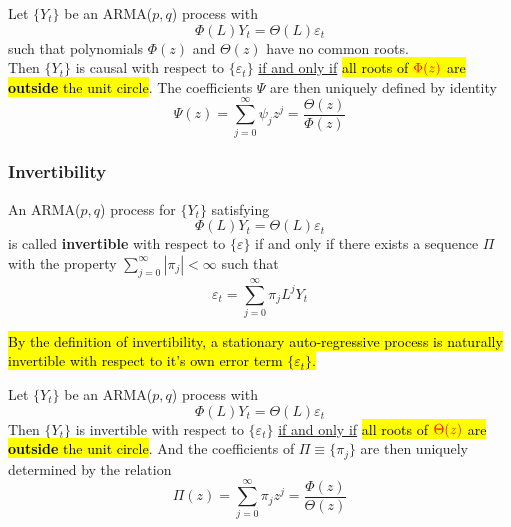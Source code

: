 \documentclass[11pt]{article}
\begin{document}
		\begin{theorem}
			Let $\{Y_t\}$ be an ARMA($p, q$) process with 
			\begin{equation}
				\Phi(L)Y_t = \Theta(L)\varepsilon_t
			\end{equation}
			such that polynomials $\Phi(z)$ and $\Theta(z)$ have no common roots.\\
			Then $\{Y_t\}$ is causal with respect to $\{\varepsilon_t\}$ \ul{if and only if} \hl{all roots of $\textcolor{red}{\Phi(z)}$ are \textbf{outside} the unit circle}. The coefficients $\Psi$ are then uniquely defined by identity
			\begin{equation}
				\Psi(z) = \sum_{j=0}^\infty \psi_j z^j = \frac{\Theta(z)}{\Phi(z)}
			\end{equation}
		\end{theorem}
	\subsubsection{Invertibility}
	\begin{definition}[Invertibility]
		An ARMA($p, q$) process for $\{Y_t\}$ satisfying
		\begin{equation}
			\Phi(L)Y_t = \Theta(L)\varepsilon_t
		\end{equation}
		is called \textbf{invertible} with respect to $\{\varepsilon\}$ if and only if there exists a sequence $\Pi$ with the property $\sum_{j=0}^\infty |\pi_j| < \infty$ such that
		\begin{equation}
			\varepsilon_t = \sum_{j=0}^\infty \pi_j L^j Y_t
		\end{equation}
	\end{definition}
	
	\begin{proposition}
		\hl{By the definition of invertibility, a stationary auto-regressive process is naturally invertible with respect to it's own error term $\{\varepsilon_t\}$.}
	\end{proposition}
	
	\begin{theorem}
		Let $\{Y_t\}$ be an ARMA($p, q$) process with 
		\begin{equation}
			\Phi(L)Y_t = \Theta(L)\varepsilon_t
		\end{equation}
		Then $\{Y_t\}$ is invertible with  respect to $\{\varepsilon_t\}$ \ul{if and only if} \hl{all roots of $\textcolor{red}{\Theta(z)}$ are \textbf{outside} the unit circle}. And the coefficients of $\Pi \equiv \{\pi_j\}$ are then uniquely determined by the relation
		\begin{equation}
			\Pi(z) = \sum_{j=0}^\infty \pi_j z^j = \frac{\Phi(z)}{\Theta(z)}
		\end{equation}
	\end{theorem}
	
\end{document}
